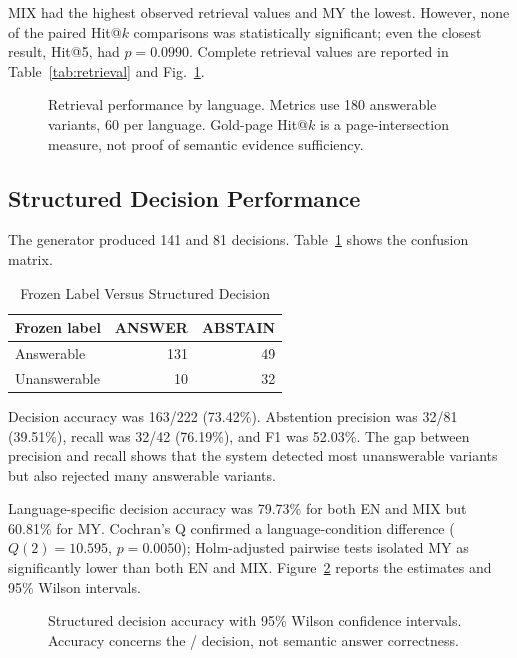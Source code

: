 \documentclass[a4paper,conference]{IEEEtran}
\newcommand{\code}[1]{\texttt{\detokenize{#1}}}
\begin{document}
MIX had the highest observed retrieval values and MY the lowest. However, none of the paired Hit@$k$ comparisons was statistically significant; even the closest result, Hit@5, had $p=0.0990$. Complete retrieval values are reported in Table~\ref{tab:retrieval} and Fig.~\ref{fig:retrieval-language}.

\begin{figure}[t]
\centering

\caption{Retrieval performance by language. Metrics use 180 answerable variants, 60 per language. Gold-page Hit@$k$ is a page-intersection measure, not proof of semantic evidence sufficiency.}
\label{fig:retrieval-language}
\end{figure}

\subsection{Structured Decision Performance}
The generator produced 141 \code{ANSWER} and 81 \code{ABSTAIN} decisions. Table~\ref{tab:confusion} shows the confusion matrix.

\begin{table}[t]
\caption{Frozen Label Versus Structured Decision}
\label{tab:confusion}
\centering
\footnotesize
\begin{tabular}{|l|r|r|}
\hline
Frozen label & ANSWER & ABSTAIN \\
\hline
Answerable   & 131 & 49 \\
\hline
Unanswerable & 10  & 32 \\
\hline
\end{tabular}
\end{table}

Decision accuracy was 163/222 (73.42\%). Abstention precision was 32/81 (39.51\%), recall was 32/42 (76.19\%), and F1 was 52.03\%. The gap between precision and recall shows that the system detected most unanswerable variants but also rejected many answerable variants.

Language-specific decision accuracy was 79.73\% for both EN and MIX but 60.81\% for MY. Cochran's Q confirmed a language-condition difference ($Q(2)=10.595$, $p=0.0050$); Holm-adjusted pairwise tests isolated MY as significantly lower than both EN and MIX. Figure~\ref{fig:decision-accuracy} reports the estimates and 95\% Wilson intervals.

\begin{figure}[t]
\centering

\caption{Structured decision accuracy with 95\% Wilson confidence intervals. Accuracy concerns the \code{ANSWER}/\code{ABSTAIN} decision, not semantic answer correctness.}
\label{fig:decision-accuracy}
\end{figure}
\end{document}
